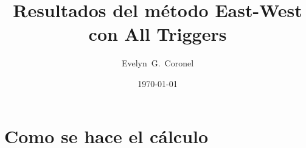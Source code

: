 
\usepackage{multirow}



\title{Resultados del método East-West con All Triggers}
\author{Evelyn~G.~Coronel}


\date[]{\lowercase{\today}} %


\maketitle

\section*{Como se hace el cálculo}

